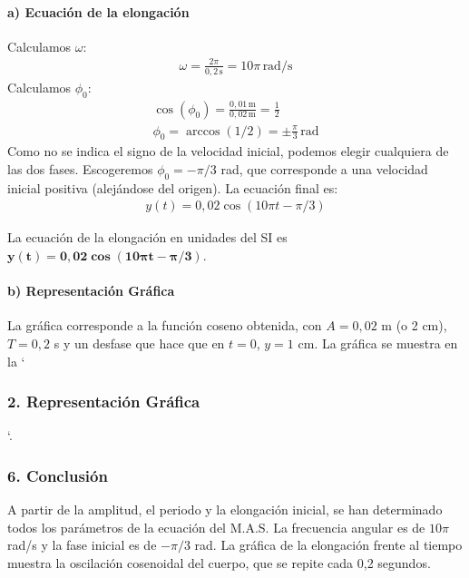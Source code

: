 \paragraph{a) Ecuación de la elongación}
Calculamos $\omega$:
\begin{gather}
    \omega = \frac{2\pi}{0,2\,\text{s}} = 10\pi \, \text{rad/s}
\end{gather}
Calculamos $\phi_0$:
\begin{gather}
    \cos(\phi_0) = \frac{0,01\,\text{m}}{0,02\,\text{m}} = \frac{1}{2} \nonumber \\
    \phi_0 = \arccos(1/2) = \pm \frac{\pi}{3} \, \text{rad}
\end{gather}
Como no se indica el signo de la velocidad inicial, podemos elegir cualquiera de las dos fases. Escogeremos $\phi_0 = -\pi/3$ rad, que corresponde a una velocidad inicial positiva (alejándose del origen). La ecuación final es:
\begin{gather}
    y(t) = 0,02 \cos(10\pi t - \pi/3)
\end{gather}
\begin{cajaresultado}
La ecuación de la elongación en unidades del SI es $\boldsymbol{y(t) = 0,02 \cos(10\pi t - \pi/3)}$.
\end{cajaresultado}

\paragraph{b) Representación Gráfica}
La gráfica corresponde a la función coseno obtenida, con $A=0,02$ m (o 2 cm), $T=0,2$ s y un desfase que hace que en $t=0$, $y=1$ cm. La gráfica se muestra en la `\subsubsection*{2. Representación Gráfica}`.

\subsubsection*{6. Conclusión}
\begin{cajaconclusion}
A partir de la amplitud, el periodo y la elongación inicial, se han determinado todos los parámetros de la ecuación del M.A.S. La frecuencia angular es de $10\pi$ rad/s y la fase inicial es de $-\pi/3$ rad. La gráfica de la elongación frente al tiempo muestra la oscilación cosenoidal del cuerpo, que se repite cada 0,2 segundos.
\end{cajaconclusion}

